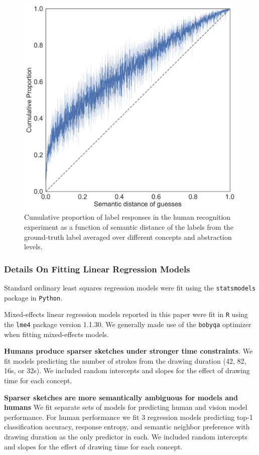 \documentclass{article}
\begin{document}
\begin{figure}
    \centering
    \includegraphics[width=.9\textwidth]{neurips_figures/neuripsDB_human_semantic_neighbor_preference.pdf}
    \caption{Cumulative proportion of label responses in the human recognition experiment as a function of semantic distance of the labels from the ground-truth label averaged over different concepts and abstraction levels.}
    \label{fig:SNP}
\end{figure}


\subsubsection{Details On Fitting Linear Regression Models}

Standard ordinary least squares regression models were fit using the \texttt{statsmodels} package in \texttt{Python}.

Mixed-effects linear regression models reported in this paper were fit in \texttt{R} using the \texttt{lme4} package version 1.1.30.
We generally made use of the \texttt{bobyqa} optimizer when fitting mixed-effects models.

\textbf{Humans produce sparser sketches under stronger time constraints}. We fit models predicting the number of strokes from the drawing duration (42, 82, 16s, or 32s). We included random intercepts and slopes for the effect of drawing time for each concept.

\textbf{Sparser sketches are more semantically ambiguous for models and humans}
We fit separate sets of models for predicting human and vision model performance.
For human performance we fit 3 regression models predicting top-1 classification accuracy, response entropy, and semantic neighbor preference with drawing duration as the only predictor in each. We included random intercepts and slopes for the effect of drawing time for each concept.
\end{document}
